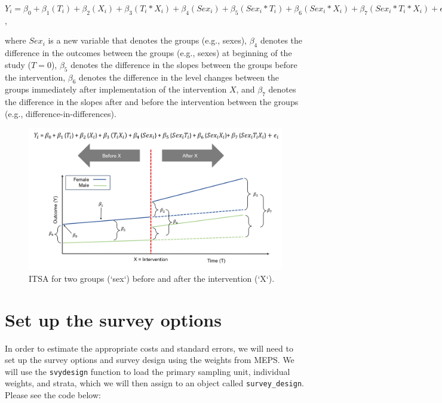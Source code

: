 \documentclass[
]{book}
\begin{document}
\(Y_i = \beta_0 + \beta_1(T_i) + \beta_2(X_i) + \beta_3(T_i * X_i) + \beta_4(Sex_i) + \beta_5(Sex_i * T_i) + \beta_6(Sex_i * X_i) + \beta_7(Sex_i * T_i * X_i) + \epsilon_i\),

where \(Sex_i\) is a new variable that denotes the groups (e.g., sexes), \(\beta_4\) denotes the difference in the outcomes between the groups (e.g., sexes) at beginning of the study (\(T = 0\)), \(\beta_5\) denotes the difference in the slopes between the groups before the intervention, \(\beta_6\) denotes the difference in the level changes between the groups immediately after implementation of the intervention \(X\), and \(\beta_7\) denotes the difference in the slopes after and before the intervention between the groups (e.g., difference-in-differences).

\begin{figure}
\includegraphics[width=1\linewidth]{Figure 6_1} \caption{ITSA for two groups (`sex`) before and after the intervention (`X`).}\label{fig:unnamed-chunk-82}
\end{figure}

\hypertarget{set-up-the-survey-options}{%
\section{Set up the survey options}\label{set-up-the-survey-options}}

In order to estimate the appropriate costs and standard errors, we will need to set up the survey options and survey design using the weights from MEPS. We will use the \texttt{svydesign} function to load the primary sampling unit, individual weights, and strata, which we will then assign to an object called \texttt{survey\_design}. Please see the code below:
\end{document}
